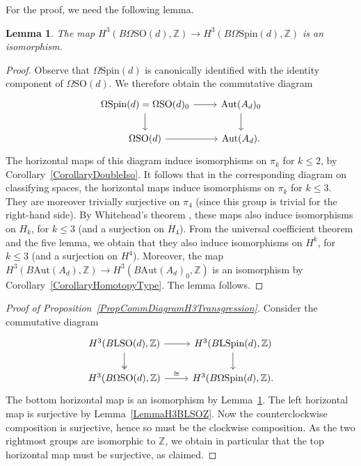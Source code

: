 \documentclass[11pt]{article}
\numberwithin{equation}{section}
\numberwithin{equation}{section}
\newtheorem{Lemma}[Theorem]{Lemma}
\newcommand{\Z}{\mathbb{Z}}
\newcommand{\SO}{\mathrm{SO}}
\newcommand{\Aut}{\mathrm{Aut}}
\newcommand{\Spin}{\mathrm{Spin}}
\renewcommand{\L}{\mathrm{L}}
\begin{document}
For the proof, we need the following lemma.

\begin{Lemma} \label{LemmaH3IsoSoSpin}
The map $H^3(B\Omega\SO(d), \Z) \to H^3(B\Omega\Spin(d), \Z)$ is an isomorphism.
\end{Lemma}

\begin{proof}
Observe that $\Omega\Spin(d)$ is canonically identified with the identity component of $\Omega\SO(d)$.
We therefore obtain the commutative diagram
\begin{equation*}
\begin{tikzcd}
 \Omega \Spin(d) = \Omega \SO(d)_0 \ar[r] \ar[d] & \Aut(A_d)_0 \ar[d] \\
 \Omega \SO(d) \ar[r] & \Aut(A_d).
\end{tikzcd}
\end{equation*}
The horizontal maps of this diagram induce isomorphisms on $\pi_k$ for $k\leq 2$, by Corollary~\ref{CorollaryDoubleIso}.
It follows that in the corresponding diagram on classifying spaces, the horizontal maps induce isomorphisms on $\pi_k$ for $k \leq 3$.
They are moreover trivially surjective on $\pi_4$ (since this group is trivial for the right-hand side).
By Whitehead's theorem \cite[Theorem~10.28]{Switzer}, these maps also induce isomorphisms on $H_k$, for $k \leq 3$ (and a surjection on $H_4$).
From the universal coefficient theorem and the five lemma, we obtain that they also induce isomorphisms on $H^k$, for $k \leq 3$ (and a surjection on $H^4$).
Moreover, the map $H^3(B\Aut(A_d), \Z) \to H^3(B\Aut(A_d)_0, \Z)$ is an isomorphism by Corollary~\ref{CorollaryHomotopyType}.
The lemma follows.
\end{proof}

\begin{proof}[Proof of Proposition~\ref{PropCommDiagramH3Transgression}]
Consider the commutative diagram
\begin{equation*}
\begin{tikzcd}
 H^3(B\L\SO(d), \Z) \ar[d, two heads] \ar[r] & H^{3}(B\L\Spin(d), \Z) \ar[d]\\
 H^3(B\Omega\SO(d), \Z) \ar[r, "\cong"] & H^3(B\Omega\Spin(d), \Z).
 \end{tikzcd}
\end{equation*}
The bottom horizontal map is an isomorphism by Lemma~\ref{LemmaH3IsoSoSpin}.
The left horizontal map is surjective by Lemma~\ref{LemmaH3BLSOZ}.
Now the counterclockwise composition is surjective, hence so must be the clockwise composition.
As the two rightmost groups are isomorphic to $\Z$, we obtain in particular that the top horizontal map must be surjective, as claimed.
\end{proof}
\end{document}
